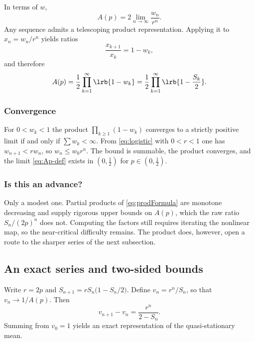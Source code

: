 In terms of \(w\),
\begin{equation}
\label{eq:Aw}
A(p) = 2\lim_{n\to\infty}\frac{w_n}{r^n}.
\end{equation}
Any sequence admits a telescoping product representation. Applying it to \(x_n=w_n/r^n\) yields ratios
\begin{equation*}
\frac{x_{k+1}}{x_k}=1-w_k,
\end{equation*}
and therefore
\begin{equation}
\label{eq:prodFormula}
A(p) = \frac12\prod_{k=1}^{\infty}\lrb{1-w_k} = \frac12\prod_{k=1}^{\infty}\lrb{1-\frac{S_k}{2}}.
\end{equation}

\subsubsection*{Convergence}

For \(0<w_k<1\) the product \(\prod_{k\ge1}(1-w_k)\) converges to a strictly positive limit if and only if \(\sum w_k<\infty\). From \cref{eq:logistic} with \(0<r<1\) one has \(w_{n+1}<rw_n\), so \(w_n\le w_0 r^n\). The bound is summable, the product converges, and the limit \cref{eq:Ap-def} exists in \((0,\tfrac12)\) for \(p\in(0,\tfrac12)\).

\subsubsection*{Is this an advance?}

Only a modest one. Partial products of \cref{eq:prodFormula} are monotone decreasing and supply rigorous upper bounds on \(A(p)\), which the raw ratio \(S_n/(2p)^n\) does not. Computing the factors still requires iterating the nonlinear map, so the near-critical difficulty remains. The product does, however, open a route to the sharper series of the next subsection.

\subsection{An exact series and two-sided bounds}
\label{sec:Abounds}

Write \(r=2p\) and \(S_{n+1}=rS_n\bigl(1-S_n/2\bigr)\). Define \(v_n=r^n/S_n\), so that \(v_n\to1/A(p)\). Then
\begin{equation*}
v_{n+1}-v_n = \frac{r^n}{2-S_n}.
\end{equation*}
Summing from \(v_0=1\) yields an exact representation of the quasi-stationary mean.

